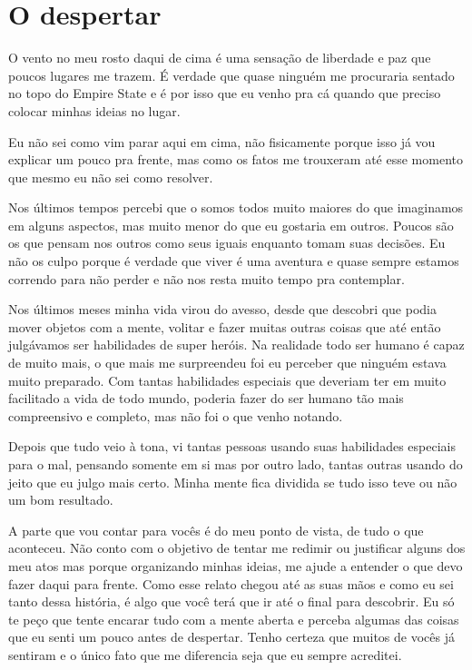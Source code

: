 
\chapter{O despertar}


O vento no meu rosto daqui de cima é uma sensação de liberdade e paz que poucos lugares me trazem. É verdade que quase ninguém me procuraria sentado no topo do Empire State e é por isso que eu venho pra cá quando que preciso colocar minhas ideias no lugar.

Eu não sei como vim parar aqui em cima, não fisicamente porque isso já vou explicar um pouco pra frente, mas como os fatos me trouxeram até esse momento que mesmo eu não sei como resolver.

Nos últimos tempos percebi que o somos todos muito maiores do que imaginamos em alguns aspectos, mas muito menor do que eu gostaria em outros. Poucos são os que pensam nos outros como seus iguais enquanto tomam suas decisões. Eu não os culpo porque é verdade que viver é uma aventura e quase sempre estamos correndo para não perder e não nos resta muito tempo pra contemplar.

Nos últimos meses minha vida virou do avesso, desde que descobri que podia mover objetos com a mente, volitar e fazer muitas outras coisas que até então julgávamos ser habilidades de super heróis. Na realidade todo ser humano é capaz de muito mais, o que mais me surpreendeu foi eu perceber que ninguém estava muito preparado. Com tantas habilidades especiais que deveriam ter em muito facilitado a vida de todo mundo, poderia fazer do ser humano tão mais compreensivo e completo, mas não foi o que venho notando.

Depois que tudo veio à tona, vi tantas pessoas usando suas habilidades especiais para o mal, pensando somente em si mas por outro lado, tantas outras usando do jeito que eu julgo mais certo. Minha mente fica dividida se tudo isso teve ou não um bom resultado.

A parte que vou contar para vocês é do meu ponto de vista, de tudo o que aconteceu. Não conto com o objetivo de tentar me redimir ou justificar alguns dos meu atos mas porque organizando minhas ideias, me ajude a entender o que devo fazer daqui para frente. Como esse relato chegou até as suas mãos e como eu sei tanto dessa história, é algo que você terá que ir até o final para descobrir. Eu só te peço que tente encarar tudo com a mente aberta e perceba algumas das coisas que eu senti um pouco antes de despertar. Tenho certeza que muitos de vocês já sentiram e o único fato que me diferencia seja que eu sempre acreditei.

